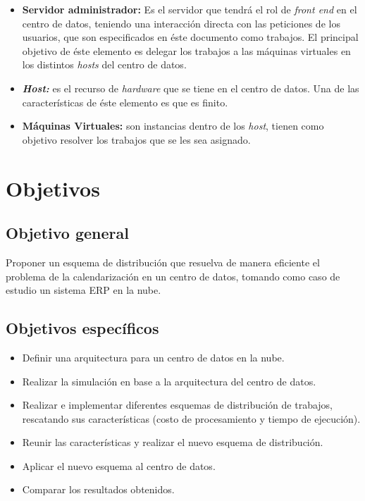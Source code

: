\begin{itemize}
	\item \textbf{Servidor administrador:} Es el servidor que tendr\'a el rol de \textit{front end} en el centro de datos, teniendo una interacci\'on directa con las peticiones de los usuarios, que son especificados en \'este documento como trabajos.
	El principal objetivo de \'este elemento es delegar los trabajos a las m\'aquinas virtuales en los distintos \textit{hosts} del centro de datos.
	\item \textit{\textbf{Host:}} es el recurso de \textit{hardware} que se tiene en el centro de datos. Una de las caracter\'isticas de \'este elemento es que es finito.
	\item \textbf{M\'aquinas Virtuales:} son instancias dentro de los \textit{host}, tienen como objetivo resolver los trabajos que se les sea asignado.
\end{itemize}


\newpage

\section*{Objetivos}


\subsection*{Objetivo general}



Proponer un esquema de distribución que resuelva de manera eficiente el problema de la calendarización en un centro de datos, tomando como caso de estudio un sistema ERP en la nube.


\subsection*{Objetivos espec\'ificos}



\begin{itemize}
	\item Definir una arquitectura para un centro de datos en la nube.
	\item Realizar la simulación en base a la arquitectura del centro de datos.
	\item Realizar e implementar diferentes esquemas de distribución de trabajos, rescatando sus características (costo de procesamiento y tiempo de ejecución).
	\item Reunir las características y realizar el nuevo esquema de distribución.
	\item Aplicar el nuevo esquema al centro de datos.
	\item Comparar los resultados obtenidos.
\end{itemize}


